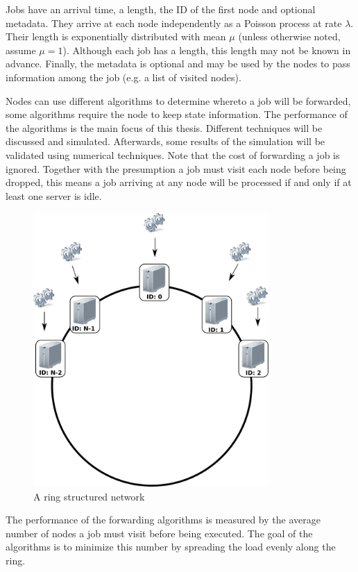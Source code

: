 \documentclass[10pt,a4paper]{article}
\begin{document}
Jobs have an arrival time, a length, the ID of the first node and optional metadata. They arrive at each node independently as a Poisson process at rate $\lambda$. Their length is exponentially distributed with mean $\mu$ (unless otherwise noted, assume $\mu=1$). Although each job has a length, this length may not be known in advance. Finally, the metadata is optional and may be used by the nodes to pass information among the job (e.g. a list of visited nodes).

Nodes can use different algorithms to determine whereto a job will be forwarded, some algorithms require the node to keep state information. The performance of the algorithms is the main focus of this thesis. Different techniques will be discussed and simulated. Afterwards, some results of the simulation will be validated using numerical techniques.
Note that the cost of forwarding a job is ignored. Together with the presumption a job must visit each node before being dropped, this means a job arriving at any node will be processed if and only if at least one server is idle.

\begin{figure}[h!tb]
\centering
\includegraphics[width=0.8\textwidth,clip=true,trim=0px 225px 0px 0px]{resources/drawing.pdf}
\caption{A ring structured network}
\label{figring}
\end{figure}

The performance of the forwarding algorithms is measured by the average number of nodes a job must visit before being executed. The goal of the algorithms is to minimize this number by spreading the load evenly along the ring. 
\end{document}
